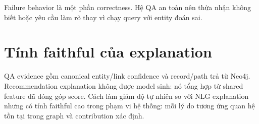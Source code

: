 Failure behavior là một phần correctness. Hệ QA an toàn nên thừa nhận không biết
hoặc yêu cầu làm rõ thay vì chạy query với entity đoán sai.

\section{Tính faithful của explanation}

QA evidence gồm canonical entity/link confidence và record/path trả từ Neo4j.
Recommendation explanation không được model sinh: nó tổng hợp từ shared feature
đã đóng góp score. Cách làm giảm độ tự nhiên so với NLG explanation \cite{colas2023knowledge} nhưng
có tính faithful cao trong phạm vi hệ thống: mỗi lý do tương ứng quan hệ tồn tại
trong graph và contribution xác định.
